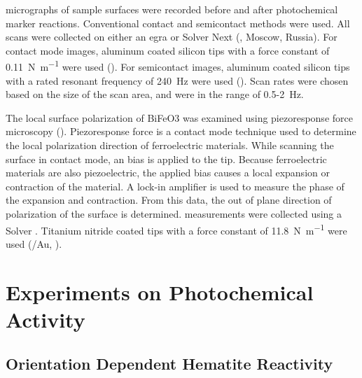 \documentclass[12pt,%
              twoside,
               letterpaper]{uiothesis}
\begin{document}
 micrographs of sample surfaces were recorded before and after photochemical
marker reactions. Conventional contact and semicontact methods were
used.\cite{Anonymous:YBI-TQ6H} All scans were collected on either an egra or
Solver Next  (, Moscow, Russia). For contact mode images, aluminum
coated silicon tips with a force constant of 0.11~\si{\newton\per\meter} were used
(). For semicontact images, aluminum coated silicon tips with a rated
resonant frequency of 240~\si{\hertz} were used (). Scan rates were
chosen based on the size of the scan area, and were in the range of 0.5-2~\si{\hertz}.  

The local surface polarization of BiFeO3 was examined using piezoresponse force
microscopy (). Piezoresponse force is a contact mode technique used to determine
the local polarization direction of ferroelectric
materials.\cite{Kalinin:2002hq,Kalinin:2006bg,Jungk:2006he,Rodriguez:2004bu} While
scanning the surface in contact mode, an  bias is applied to the tip. Because
ferroelectric materials are also piezoelectric, the applied bias causes a local expansion
or contraction of the material. A lock-in amplifier is used to measure the phase of the
expansion and contraction. From this data, the out of plane direction of polarization of
the surface is determined.  measurements were collected using a
Solver . Titanium nitride coated tips with a force constant of
11.8~\si{\newton\per\meter} were used (/Au, ).
	
	\part{Experiments on Photochemical Activity}


\chapter{Orientation Dependent Hematite Reactivity}
\label{ch:fe2o3orientation}
\end{document}

